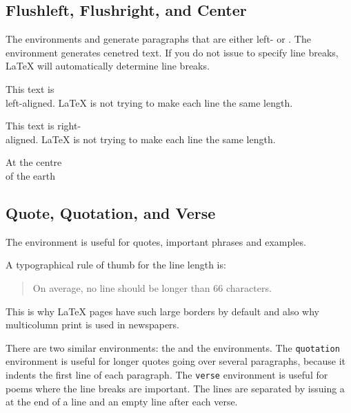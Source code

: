 \subsection{Flushleft, Flushright, and Center}

The environments  and  generate
paragraphs that are either left- or .  The  environment generates cenetred text. If you
do not issue \ci{\bs} to specify line breaks, \LaTeX{} will
automatically determine line breaks.

\begin{example}
\begin{flushleft}
This text is\\ left-aligned.
\LaTeX{} is not trying to make
each line the same length.
\end{flushleft}
\end{example}

\begin{example}
\begin{flushright}
This text is right-\\aligned.
\LaTeX{} is not trying to make
each line the same length.
\end{flushright}
\end{example}

\begin{example}
\begin{center}
At the centre\\of the earth
\end{center}
\end{example}

\subsection{Quote, Quotation, and Verse}

The  environment is useful for quotes, important phrases and
examples.

\begin{example}
A typographical rule of thumb
for the line length is:
\begin{quote}
On average, no line should
be longer than 66 characters.
\end{quote}
This is why \LaTeX{} pages have
such large borders by default
and also why multicolumn print
is used in newspapers.
\end{example}

There are two similar environments: the  and the
 environments. The \texttt{quotation} environment is useful
for longer quotes going over several paragraphs, because it indents the
first line of each paragraph. The \texttt{verse} environment is useful for poems
where the line breaks are important. The lines are separated by
issuing a \ci{\bs} at the end of a line and an empty line after each
verse.



